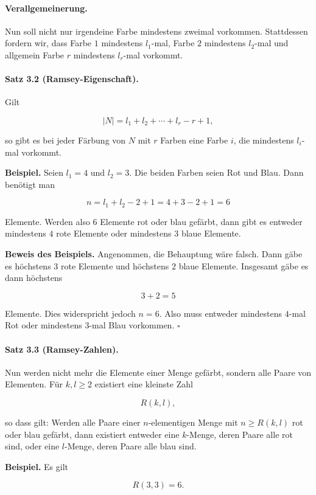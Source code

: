 \documentclass{article}
\begin{document}
\paragraph{Verallgemeinerung.}
Nun soll nicht nur irgendeine Farbe mindestens zweimal vorkommen. Stattdessen
fordern wir, dass Farbe \(1\) mindestens \(l_1\)-mal, Farbe \(2\) mindestens
\(l_2\)-mal und allgemein Farbe \(r\) mindestens \(l_r\)-mal vorkommt.

\paragraph{Satz 3.2 (Ramsey-Eigenschaft).}
Gilt

\[
|N|=l_1+l_2+\cdots+l_r-r+1,
\]

so gibt es bei jeder Färbung von \(N\) mit \(r\) Farben eine Farbe \(i\),
die mindestens \(l_i\)-mal vorkommt.

\textbf{Beispiel.}
Seien \(l_1=4\) und \(l_2=3\). Die beiden Farben seien Rot und Blau.
Dann benötigt man

\[
n=l_1+l_2-2+1=4+3-2+1=6
\]

Elemente. Werden also \(6\) Elemente rot oder blau gefärbt, dann gibt es
entweder mindestens \(4\) rote Elemente oder mindestens \(3\) blaue Elemente.

\textbf{Beweis des Beispiels.}
Angenommen, die Behauptung wäre falsch. Dann gäbe es höchstens \(3\) rote
Elemente und höchstens \(2\) blaue Elemente. Insgesamt gäbe es dann höchstens

\[
3+2=5
\]

Elemente. Dies widerspricht jedoch \(n=6\). Also muss entweder mindestens
\(4\)-mal Rot oder mindestens \(3\)-mal Blau vorkommen.
\hfill\(\square\)

\paragraph{Satz 3.3 (Ramsey-Zahlen).}
Nun werden nicht mehr die Elemente einer Menge gefärbt, sondern alle Paare von
Elementen. Für \(k,l\geq 2\) existiert eine kleinste Zahl

\[
R(k,l),
\]

so dass gilt: Werden alle Paare einer \(n\)-elementigen Menge mit
\(n\geq R(k,l)\) rot oder blau gefärbt, dann existiert entweder eine
\(k\)-Menge, deren Paare alle rot sind, oder eine \(l\)-Menge, deren Paare
alle blau sind.

\textbf{Beispiel.}
Es gilt

\[
R(3,3)=6.
\]
\end{document}
